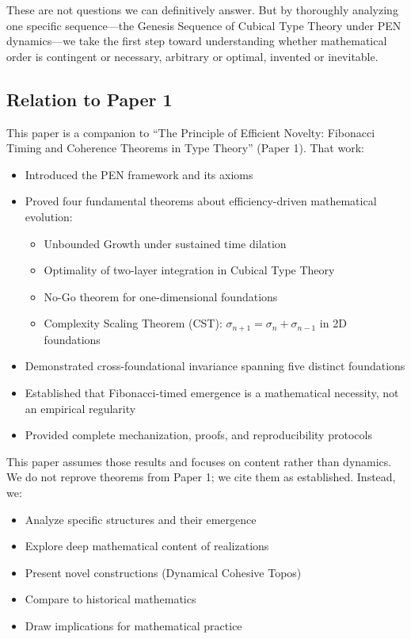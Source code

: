 \documentclass[11pt]{article}
\theoremstyle{definition}
\begin{document}
These are not questions we can definitively answer. But by thoroughly analyzing one specific sequence—the Genesis Sequence of Cubical Type Theory under PEN dynamics—we take the first step toward understanding whether mathematical order is contingent or necessary, arbitrary or optimal, invented or inevitable.

\subsection{Relation to Paper 1}

This paper is a companion to ``The Principle of Efficient Novelty: Fibonacci Timing and Coherence Theorems in Type Theory'' (Paper 1). That work:
\begin{itemize}
\item Introduced the PEN framework and its axioms
\item Proved four fundamental theorems about efficiency-driven mathematical evolution:
\begin{itemize}
    \item Unbounded Growth under sustained time dilation
    \item Optimality of two-layer integration in Cubical Type Theory
    \item No-Go theorem for one-dimensional foundations
    \item Complexity Scaling Theorem (CST): $\sigma_{n+1} = \sigma_n + \sigma_{n-1}$ in 2D foundations
\end{itemize}
\item Demonstrated cross-foundational invariance spanning five distinct foundations
\item Established that Fibonacci-timed emergence is a mathematical necessity, not an empirical regularity
\item Provided complete mechanization, proofs, and reproducibility protocols
\end{itemize}

This paper assumes those results and focuses on content rather than dynamics. We do not reprove theorems from Paper 1; we cite them as established. Instead, we:
\begin{itemize}
\item Analyze specific structures and their emergence
\item Explore deep mathematical content of realizations
\item Present novel constructions (Dynamical Cohesive Topos)
\item Compare to historical mathematics
\item Draw implications for mathematical practice
\end{itemize}
\end{document}
